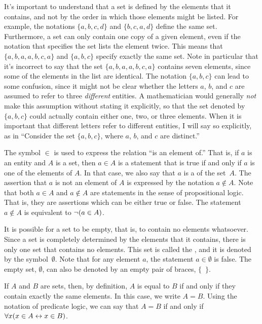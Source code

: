It's important to understand that a set is defined by the elements that
it contains, and not by the order in which those elements might be listed.
For example, the notations $\{a,b,c,d\}$ and $\{b,c,a,d\}$ define the same
set.   Furthermore, a set can only contain one copy of a given element,
even if the notation that specifies the set lists the element twice.
This means that $\{a,b,a,a,b,c,a\}$ and $\{a,b,c\}$ specify exactly the
same set.  Note in particular that it's incorrect to say that
the set $\{a,b,a,a,b,c,a\}$ contains seven elements, since some of the
elements in the list are identical.  The notation $\{a,b,c\}$ can lead
to some confusion, since it might not be clear whether the letters $a$,
$b$, and $c$ are assumed to refer to three \emph{different} entities.
A mathematician would generally \emph{not} make this assumption without
stating it explicitly, so that the set denoted by $\{a,b,c\}$ could
actually contain either one, two, or three elements.  When it is important
that different letters refer to different entities, I will say so explicitly,
as in ``Consider the set $\{a,b,c\}$, where $a$, $b$, and $c$ are distinct.''

The symbol $\in$ is used to express the relation ``is an element of.''
That is, if $a$ is an entity and $A$ is a set, then $a\in A$ is a statement
that is true if and only if $a$ is one of the elements of $A$.  In that
case, we also say that $a$ is a  of
the set~$A$.  The assertion that $a$ is not an element of $A$ is
expressed by the notation $a\not\in A$.  Note that both $a\in A$
and $a\not\in A$ are statements in the sense of propositional logic.
That is, they are assertions which can be either true or false.
The statement $a\not\in A$ is equivalent to $\lnot(a\in A)$.

It is possible for a set to be empty, that is, to contain no elements
whatsoever.  Since a set is completely determined by the elements
that it contains, there is only one set that contains no elements.
This set is called the , and it is denoted by the
symbol~$\emptyset$.  Note that for any element $a$, the
statement $a\in\emptyset$ is false.  The empty set, $\emptyset$, can also
be denoted by an empty pair of braces, $\{$~$\}$.

If $A$ and $B$ are sets, then, by definition, $A$ is equal to $B$ if and only
if they contain exactly the same elements.  In this case, we write $A=B$.
Using the notation of predicate logic, we can say that $A=B$ if and only
if $\forall x(x\in A \leftrightarrow x\in B)$.  

